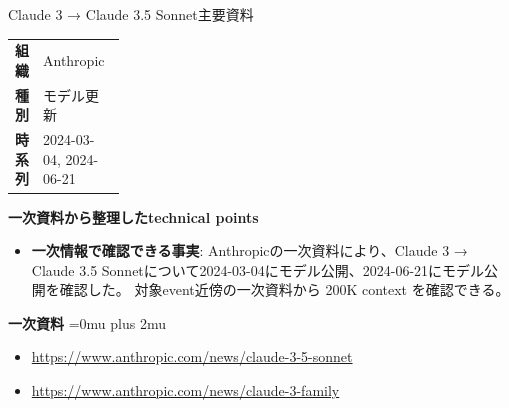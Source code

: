 \Needspace{0.38\textheight}
\begin{technicalnote}{Claude 3 → Claude 3.5 Sonnet}{主要資料}
\begingroup
\begin{tabularx}{\linewidth}{@{}>{\bfseries}p{0.22\linewidth}X@{}}
組織 & Anthropic \\
種別 & モデル更新 \\
時系列 & 2024-03-04, 2024-06-21 \\
\end{tabularx}
\smallskip
\begin{minipage}{\linewidth}
{\bfseries 一次資料から整理したtechnical points}
\begin{itemize}[leftmargin=1.5em,itemsep=0.35em]
\item \textbf{一次情報で確認できる事実}: Anthropicの一次資料により、Claude 3 → Claude 3.5 Sonnetについて2024-03-04にモデル公開、2024-06-21にモデル公開を確認した。 対象event近傍の一次資料から 200K context を確認できる。
\end{itemize}
\begin{minipage}{\linewidth}
\begin{samepage}
{\bfseries 一次資料}
\begingroup\sloppy
\Urlmuskip=0mu plus 2mu\relax
\begin{itemize}[leftmargin=1.5em,itemsep=0.25em]
\item {\scriptsize\url{https://www.anthropic.com/news/claude-3-5-sonnet}}
\item {\scriptsize\url{https://www.anthropic.com/news/claude-3-family}}
\end{itemize}
\endgroup
\end{samepage}
\end{minipage}
\end{minipage}
\endgroup
\end{technicalnote}
\medskip

